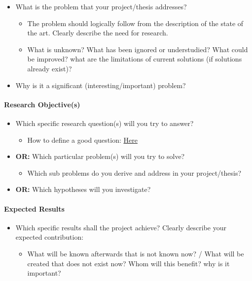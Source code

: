 \documentclass[akbc,twoside,11pt,lettersize]{article}
\begin{document}
\begin{itemize}
    \item What is the problem that your project/thesis addresses? 
    \begin{itemize}
        \item The problem should logically follow from the description of the state of the art. Clearly describe the need for research.
        \item What is unknown? What has been ignored or understudied? What could be improved? what are the limitations of current solutions (if solutions already exist)?
    \end{itemize}
    \item Why is it a significant (interesting/important) problem?
\end{itemize}  

\paragraph{Research Objective(s)}

\begin{itemize}
    \item Which specific research question(s) will you try to answer? 
    \begin{itemize}
        \item How to define a good question: \href{https://www.youtube.com/watch?v=89NonP_iZZo}{Here}
    \end{itemize}
    \item \textbf{OR:} Which particular problem(s) will you try to solve?
	\begin{itemize}
	    \item Which sub problems do you derive and address in your project/thesis?
	\end{itemize}
	\item \textbf{OR:} Which hypotheses will you investigate?
\end{itemize}

\paragraph{Expected Results}
\begin{itemize}
    \item Which specific results shall the project achieve? Clearly describe your expected contribution: 
    \begin{itemize}
        \item What will be known afterwards that is not known now? / What will be created that does not exist now? Whom will this benefit? why is it important?
    \end{itemize}
\end{itemize}
\end{document}
